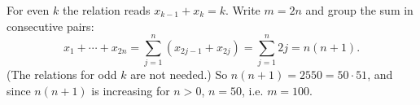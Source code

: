 For even $k$ the relation reads $x_{k-1}+x_k=k$. Write $m=2n$ and group the sum in consecutive pairs:
\[x_1+\cdots+x_{2n}=\sum_{j=1}^{n}\left(x_{2j-1}+x_{2j}\right)=\sum_{j=1}^{n}2j=n(n+1).\]
(The relations for odd $k$ are not needed.) So $n(n+1)=2550=50\cdot51$, and since $n(n+1)$ is increasing for $n>0$, $n=50$, i.e. $m=\boxed{100}$.
